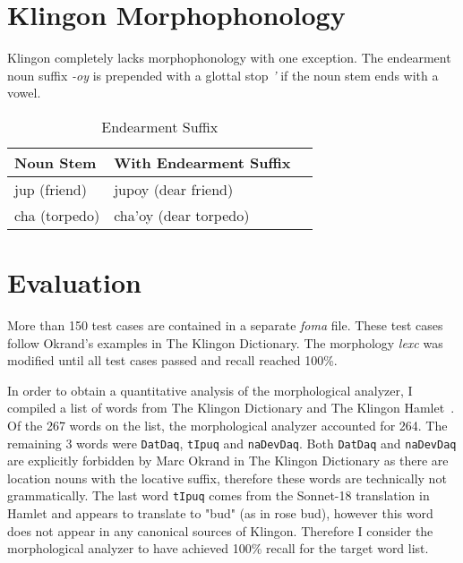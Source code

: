 \documentclass[11pt]{article}
\begin{document}
\section{Klingon Morphophonology}

Klingon completely lacks morphophonology with one exception. The endearment noun suffix \textit{-oy} is prepended with a glottal stop \textit{'} if the noun stem ends with a vowel.

	\begin{table}[h]
	\begin{center}
	\begin{tabular}{lll}
	\toprule
	\bf Noun Stem & \bf With Endearment Suffix \\
	\midrule
	jup (friend) & jupoy (dear friend) \\
	cha (torpedo) & cha'oy (dear torpedo) \\
	\bottomrule
	\end{tabular}
	\end{center}
	\caption{Endearment Suffix}
	\end{table}

\section{Evaluation}

More than 150 test cases are contained in a separate \textit{foma} file. These test cases follow Okrand's examples in The Klingon Dictionary. The morphology \textit{lexc} was modified until all test cases passed and recall reached 100\%.

In order to obtain a quantitative analysis of the morphological analyzer, I compiled a list of words from The Klingon Dictionary and The Klingon Hamlet~\cite{0964434512}. Of the 267 words on the list, the morphological analyzer accounted for 264. The remaining 3 words were \texttt{DatDaq}, \texttt{tIpuq} and \texttt{naDevDaq}. Both \texttt{DatDaq} and \texttt{naDevDaq} are explicitly forbidden by Marc Okrand in The Klingon Dictionary as there are location nouns with the locative suffix, therefore these words are technically not grammatically. The last word \texttt{tIpuq} comes from the Sonnet-18 translation in Hamlet and appears to translate to "bud" (as in rose bud), however this word does not appear in any canonical sources of Klingon. Therefore I consider the morphological analyzer to have achieved 100\% recall for the target word list.



\end{document}
